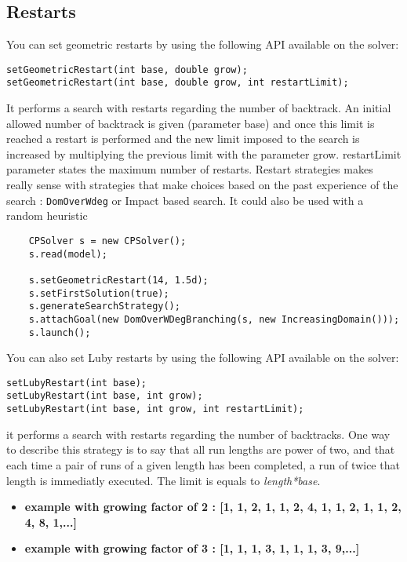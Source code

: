 \subsection{Restarts}\label{solver:restarts}\hypertarget{solver:restarts}{}

You can set geometric restarts by using the following API available on the solver:
\begin{lstlisting}
setGeometricRestart(int base, double grow);
setGeometricRestart(int base, double grow, int restartLimit);
\end{lstlisting}
It performs a search with restarts regarding the number of backtrack. An initial allowed number of backtrack is given (parameter base) and once this limit is reached a restart is performed and the new limit imposed to the search is increased by multiplying the previous limit with the parameter grow. restartLimit parameter states the maximum number of restarts. Restart strategies makes really sense with strategies that make choices based on the past experience of the search : \texttt{DomOverWdeg} or Impact based search. It could also be used with a random heuristic
\begin{lstlisting}
	CPSolver s = new CPSolver();
	s.read(model);
	
	s.setGeometricRestart(14, 1.5d);
	s.setFirstSolution(true);
	s.generateSearchStrategy();
	s.attachGoal(new DomOverWDegBranching(s, new IncreasingDomain()));
	s.launch();
\end{lstlisting}

You can also set Luby restarts by using the following API available on the solver:
\begin{lstlisting}
setLubyRestart(int base);
setLubyRestart(int base, int grow);
setLubyRestart(int base, int grow, int restartLimit);
\end{lstlisting}
it performs a search with restarts regarding the number of backtracks. One way to describe this strategy is to say that all run lengths are power of two, and that each time a pair of runs of a given length has been completed, a run of twice that length is immediatly executed. The limit is equals to \emph{length*base}.
\begin{itemize}
	\item \textbf{example with growing factor of 2 : [1, 1, 2, 1, 1, 2, 4, 1, 1, 2, 1, 1, 2, 4, 8, 1,...]}
	\item \textbf{example with growing factor of 3 : [1, 1, 1, 3, 1, 1, 1, 3, 9,...]}
\end{itemize}

